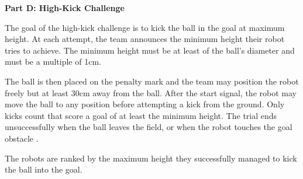 \clearpage
\sffamily
{\bfseries\color[rgb]{0.4,0.4,0.4} Part D: High-Kick Challenge}
{}


\bigskip

The goal of the high-kick challenge is to kick the ball in the goal at maximum height. At each attempt, the team announces the minimum height their robot tries to achieve. The minimum height must be at least   of the ball's diameter and must be a multiple of 1cm.

The ball is then placed on the penalty mark and the team may position the robot freely but at least 30cm away from the ball. After the start signal, the robot may move the ball to any position before attempting a kick from the ground. Only kicks count that score a goal of at least the minimum height. The trial ends unsuccessfully when the ball leaves the field, or when the robot touches the goal obstacle .

The robots are ranked by the maximum height they successfully managed to kick the ball into the goal.